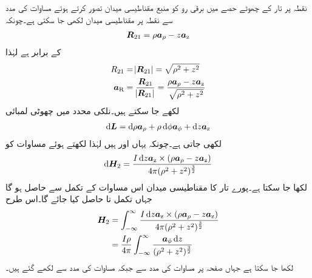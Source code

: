نقطہ  پر تار کے چھوٹے حصے  میں برقی رو کو منبع مقناطیسی میدان تصور کرتے ہوئے مساوات  کی مدد سے نقطہ  پر مقناطیسی میدان لکھی جا سکتی ہے۔چونکہ 
\begin{align*}
{\ensuremath{{\boldsymbol{R}}}}_{21}=\rho {\boldsymbol{a}}_{\rho}-z {\boldsymbol{a}}_{\textup{z}}
\end{align*}
کے برابر ہے لہٰذا
\begin{align*}
R_{21}&=\abs{{{\boldsymbol{R}}}_{21}}=\sqrt{\rho^2+z^2}\\
{\boldsymbol{a}}_{\textup{R}}&=\frac{{{\boldsymbol{R}}}_{21}}{\abs{{{\boldsymbol{R}}}_{21}}}=\frac{\rho {\boldsymbol{a}}_{\rho}-z {\boldsymbol{a}}_{\textup{z}}}{\sqrt{\rho^2+z^2}}
\end{align*}
لکھے جا سکتے ہیں۔نلکی محدد میں چھوٹی لمبائی
\begin{align*}
\dif \kvec{L}=\dif \rho \arho+\rho \dif \phi \aphi+\dif z \az
\end{align*}
لکھی جاتی ہے۔چونکہ یہاں  اور  ہیں لہٰذا  لکھتے ہوئے  مساوات  کو
\begin{align*}
\dif \kvec{H}_2=\frac{I \dif z \az \times (\rho \arho -z\az)}{4 \pi (\rho^2+z^2)^{\frac{3}{2}}}
\end{align*}
لکھا جا سکتا ہے۔پورے تار کا مقناطیسی میدان اس مساوات کے تکمل سے حاصل ہو گا جہاں تکمل تا  حاصل کیا جائے گا۔اس طرح
\begin{align*}
\kvec{H}_2&=\int_{-\infty}^{\infty}\frac{I \dif z \az \times (\rho \arho -z\az)}{4 \pi (\rho^2+z^2)^{\frac{3}{2}}}\\
&=\frac{I \rho}{4\pi}\int_{-\infty}^{\infty} \frac{\aphi \dif z }{(\rho^2+z^2)^{\frac{3}{2}}}
\end{align*}    
لکھا جا سکتا ہے جہاں صفحہ  پر مساوات  کی مدد سے  جبکہ مساوات  کی مدد سے  لکھے گئے ہیں۔


